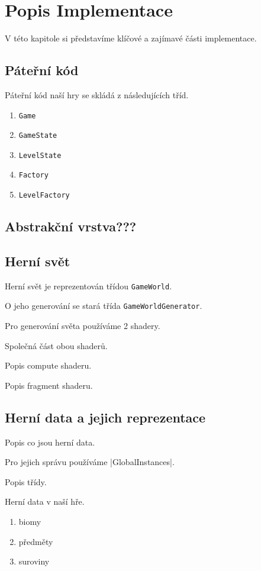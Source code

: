 \chapter{Popis Implementace}
V této kapitole si představíme klíčové a zajímavé části implementace.

\section{Páteřní kód}
Páteřní kód naší hry se skládá z následujících tříd.

\begin{enumerate}
    \item \verb|Game|
    \item \verb|GameState|
    \item \verb|LevelState|
    \item \verb|Factory|
    \item \verb|LevelFactory|
\end{enumerate}

\section{Abstrakční vrstva???}

\section{Herní svět}
Herní svět je reprezentován třídou \verb|GameWorld|.

O jeho generování se stará třída \verb|GameWorldGenerator|.

Pro generování světa používáme 2 shadery.

Společná část obou shaderů.

Popis compute shaderu.

Popis fragment shaderu.

\section{Herní data a jejich reprezentace}
Popis co jsou herní data.

Pro jejich správu používáme |GlobalInstances|.

Popis třídy.

Herní data v naší hře.

\begin{enumerate}
    \item biomy
    \item předměty
    \item suroviny
\end{enumerate}

